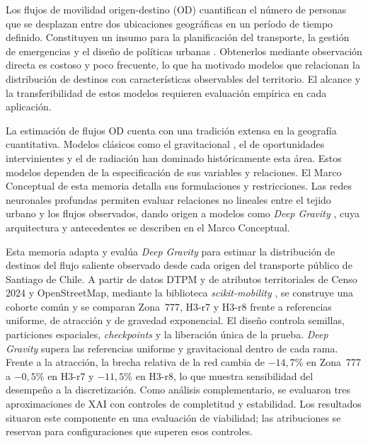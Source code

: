 
Los flujos de movilidad origen-destino (OD) cuantifican el número de personas que se desplazan entre dos ubicaciones geográficas en un período de tiempo definido. Constituyen un insumo para la planificación del transporte, la gestión de emergencias y el diseño de políticas urbanas \cite{liu2024interdisciplinary}. Obtenerlos mediante observación directa es costoso y poco frecuente, lo que ha motivado modelos que relacionan la distribución de destinos con características observables del territorio. El alcance y la transferibilidad de estos modelos requieren evaluación empírica en cada aplicación.

La estimación de flujos OD cuenta con una tradición extensa en la geografía cuantitativa. Modelos clásicos como el gravitacional \cite{zipf1946p}, el de oportunidades intervinientes \cite{stouffer1940intervening} y el de radiación \cite{simini2012universal} han dominado históricamente esta área. Estos modelos dependen de la especificación de sus variables y relaciones. El Marco Conceptual de esta memoria detalla sus formulaciones y restricciones. Las redes neuronales profundas permiten evaluar relaciones no lineales entre el tejido urbano y los flujos observados, dando origen a modelos como \textit{Deep Gravity} \cite{simini2021deep}, cuya arquitectura y antecedentes se describen en el Marco Conceptual.

Esta memoria adapta y evalúa \textit{Deep Gravity} para estimar la distribución de destinos del flujo saliente observado desde cada origen del transporte público de Santiago de Chile. A partir de datos DTPM y de atributos territoriales de Censo 2024 y OpenStreetMap, mediante la biblioteca \textit{scikit-mobility} \cite{pappalardo2023scikitmobility}, se construye una cohorte común y se comparan Zona~777, H3-r7 y H3-r8 frente a referencias uniforme, de atracción y de gravedad exponencial. El diseño controla semillas, particiones espaciales, \textit{checkpoints} y la liberación única de la prueba. \textit{Deep Gravity} supera las referencias uniforme y gravitacional dentro de cada rama. Frente a la atracción, la brecha relativa de la red cambia de $-14{,}7\%$ en Zona~777 a $-0{,}5\%$ en H3-r7 y $-11{,}5\%$ en H3-r8, lo que muestra sensibilidad del desempeño a la discretización. Como análisis complementario, se evaluaron tres aproximaciones de XAI con controles de completitud y estabilidad. Los resultados situaron este componente en una evaluación de viabilidad; las atribuciones se reservan para configuraciones que superen esos controles.

